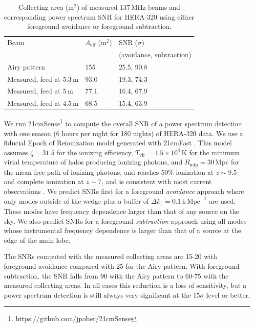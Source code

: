 \documentclass{emulateapj}
\begin{document}
 \begin{table}[h]
 \caption{ \label{table:collectingareatable}Collecting area (m$^2$) of measured 137\,MHz beams and corresponding power spectrum SNR for HERA-320 using either foreground avoidance or foreground subtraction.}
\begin{tabular}{| l | l | l |}
\hline
Beam & $A_\text{eff}$ (m$^2$) & SNR ($\sigma$)\\
&& (avoidance, subtraction)\\
\hline
  Airy pattern & 155 & 25.5, 90.8  \\
    Measured, feed at 5.3\,m & 93.0 & 19.3, 74.3 \\
    Measured, feed at 5\,m & 77.1 &  16.4, 67.9 \\
    Measured, feed at 4.5\,m & 68.5 &  15.4, 63.9 \\ 
  \hline
\end{tabular}
\end{table}

We run 21cmSense\footnote{https://github.com/jpober/21cmSense} to compute the overall SNR of a power spectrum detection with one season (6 hours per night for 180 nights) of HERA-320 data. We use a fiducial Epoch of Reionization model generated with 21cmFast \citep{21cmfast}. This model assumes $\zeta=31.5$ for the ionizing efficiency, $T_\mathrm{vir}=1.5\times10^4$\,K for the minimum virial temperature of halos producing ionizing photons, and $R_\text{mfp}=30$\,Mpc for the mean free path of ionizing photons, and reaches 50\% ionization at $z \sim 9.5$ and complete ionization at $z \sim 7$, and is consistent with most current observations \citep[e.g.][]{PoberNextGen}. We predict SNRs first for a foreground \textit{avoidance} approach where only modes outside of the wedge plus a buffer of $\Delta k_\parallel=0.1\,\mathrm{h}\,\mathrm{Mpc}^{-1}$ are used. These modes have frequency dependence larger than that of any source on the sky. We also predict SNRs for a foreground \textit{subtraction} approach using all modes whose instrumental frequency dependence is larger than that of a source at the edge of the main lobe. 

The SNRs computed with the measured collecting areas are 15-20 with foreground avoidance compared with 25 for the Airy pattern. With foreground subtraction, the SNR falls from 90 with the Airy pattern to 60-75 with the measured collecting areas. In all cases this reduction is a loss of sensitivity, but a power spectrum detection is still always very significant at the 15$\sigma$ level or better.
\end{document}
